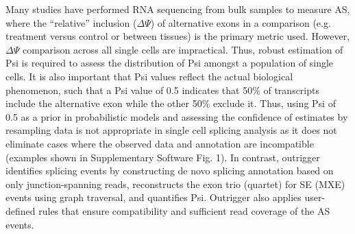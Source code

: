 Many studies have performed RNA sequencing from bulk samples to measure AS, where the “relative” inclusion ($\Delta\Psi$) of alternative exons in a comparison (e.g. treatment versus control or between tissues) is the primary metric used. However, $\Delta\Psi$ comparison across all single cells are impractical. Thus, robust estimation of Psi is required to assess the distribution of Psi amongst a population of single cells. It is also important that Psi values reflect the actual biological phenomenon, such that a Psi value of 0.5 indicates that 50\% of transcripts include the alternative exon while the other 50\% exclude it. Thus, using Psi of 0.5 as a prior in probabilistic models and assessing the confidence of estimates by resampling data \cite{Katz:2010iv} is not appropriate in single cell splicing analysis as it does not eliminate cases where the observed data and annotation are incompatible (examples shown in Supplementary Software Fig. 1). In contrast, outrigger identifies splicing events by constructing de novo splicing annotation based on only junction-spanning reads, reconstructs the exon trio (quartet) for SE (MXE) events using graph traversal, and quantifies Psi. Outrigger also applies user-defined rules that ensure compatibility and sufficient read coverage of the AS events.

